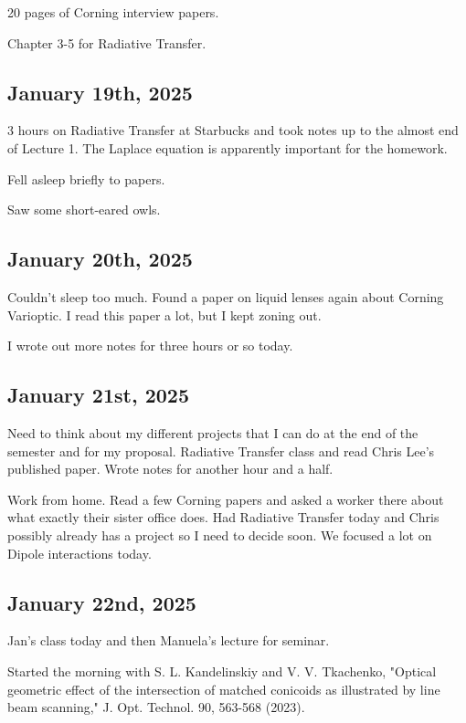 \documentclass{article}
\begin{document}


20 pages of Corning interview papers. 

Chapter 3-5 for Radiative Transfer. 

\subsection{January 19th, 2025}
3 hours on Radiative Transfer at Starbucks and took notes up to the almost end of Lecture 1. The Laplace equation is apparently important for the homework. 

Fell asleep briefly to papers. 

Saw some short-eared owls. 

\subsection{January 20th, 2025}
Couldn't sleep too much. Found a paper on liquid lenses again about Corning Varioptic. I read this paper a lot, but I kept zoning out. 

I wrote out more notes for three hours or so today. 


\subsection{January 21st, 2025}
Need to think about my different projects that I can do at the end of the semester and for my proposal. Radiative Transfer class and read Chris Lee's published paper. Wrote notes for another hour and a half. 


Work from home. Read a few Corning papers and asked a worker there about what exactly their sister office does. Had Radiative Transfer today and Chris possibly already has a project so I need to decide soon. We focused a lot on Dipole interactions today. 

\subsection{January 22nd, 2025}
Jan's class today and then Manuela's lecture for seminar. 


Started the morning with S. L. Kandelinskiy and V. V. Tkachenko, "Optical geometric effect of the intersection of matched conicoids as illustrated by line beam scanning," J. Opt. Technol. 90, 563-568 (2023). 
\end{document}
